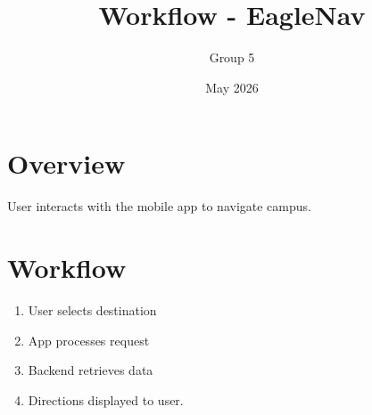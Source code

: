 \documentclass{article}
\title{Workflow - EagleNav}
\author{Group 5}
\date{May 2026}
\begin{document}
\maketitle

\section{Overview}
User interacts with the mobile app to navigate campus.

\section{Workflow}
\begin{enumerate}
\item{User selects destination}
\item{App processes request}
\item{Backend retrieves data}
\item{Directions displayed to user.}
\end{enumerate}
\end{document}
